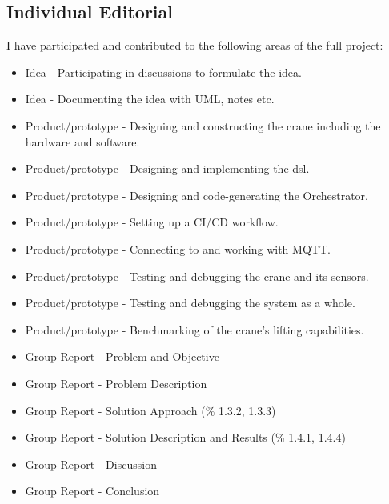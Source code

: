 \vspace{-10pt}
\subsection*{Individual Editorial}

I have participated and contributed to the following areas of the full project:

\begin{itemize}[leftmargin=*]
    \item Idea - Participating in discussions to formulate the idea.
    \item Idea - Documenting the idea with UML, notes etc.
    \item Product/prototype -  Designing and constructing the crane including the hardware and software.
    \item Product/prototype -  Designing and implementing the \acrshort{dsl}.
    \item Product/prototype -  Designing and code-generating the Orchestrator.
    \item Product/prototype -  Setting up a CI/CD workflow.
    \item Product/prototype -  Connecting to and working with MQTT.
    \item Product/prototype -  Testing and debugging the crane and its sensors.
    \item Product/prototype -  Testing and debugging the system as a whole.
    \item Product/prototype -  Benchmarking of the crane's lifting capabilities.
    \item Group Report - Problem and Objective
    \item Group Report - Problem Description
    \item Group Report - Solution Approach (\% 1.3.2, 1.3.3)
    \item Group Report - Solution Description and Results (\% 1.4.1, 1.4.4)
    \item Group Report - Discussion
    \item Group Report - Conclusion
\end{itemize}